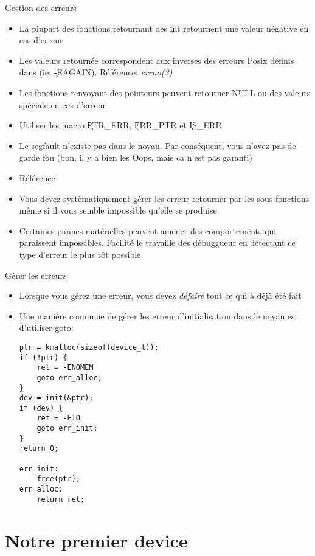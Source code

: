 \begin{frame}[fragile=singleslide]{Gestion des erreurs}
  \begin{itemize} 
  \item La plupart des fonctions retournant des \c{int} retournent une
    valeur négative en cas d'erreur
  \item Les  valeurs retournée correspondent aux  inverses des erreurs
    Posix  définis dans   (ie:  \c{-EAGAIN}). Référence:
    \emph{errno(3)}
  \item  Les  fonctions  renvoyant des  pointeurs  peuvent
    retourner NULL ou des valeurs spéciale en cas d'erreur
  \item Utiliser les macro \c{PTR_ERR}, \c{ERR_PTR} et \c{IS_ERR}
  \item Le segfault n'existe pas  dans le noyau.  Par conséquent, vous
    n'avez pas de garde fou (bon, il  y a bien les Oops, mais ca n'est
    pas garanti)
  \item Référence 
  \item Vous devez systèmatiquement gérer les erreur retourner par les
    sous-fonctions  même  si  il  vous semble  impossible  qu'elle  se
    produise.
  \item Certaines pannes  matérielles peuvent amener des comportements
    qui paraissent  impossibles. Facilité le  travaille des débuggueur
    en détectant ce type d'erreur le plus tôt possible
  \end{itemize}
\end{frame}
\begin{frame}[fragile=singleslide]{Gérer les erreurs}
  \begin{itemize} 
  \item Lorsque vous gérez  une erreur, vous devez \emph{défaire} tout
    ce qui à déjà été fait
  \item Une manière commnue  de gérer les erreur d'initialisation dans
    le noyau est d'utiliser \c{goto}:
    \begin{lstlisting}
ptr = kmalloc(sizeof(device_t));
if (!ptr) {
    ret = -ENOMEM
    goto err_alloc;
}
dev = init(&ptr);
if (dev) {
    ret = -EIO
    goto err_init;
}
return 0;

err_init:
    free(ptr);
err_alloc:
    return ret;
    \end{lstlisting} 
  \end{itemize} 
\end{frame} 



\section{Notre premier device}


